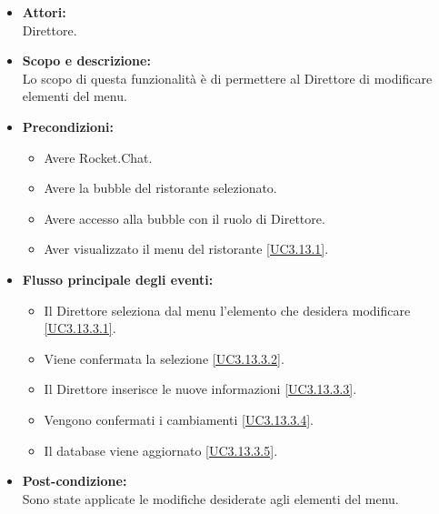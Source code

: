 
\begin{itemize}
	\item \textbf{Attori:}
	\\Direttore.
	\item \textbf{Scopo e descrizione:} 
	\\Lo scopo di questa funzionalità è di permettere al Direttore di modificare elementi del menu.
	\item \textbf{Precondizioni:}
	\begin{itemize}
		\item Avere Rocket.Chat.
		\item Avere la bubble del ristorante selezionato.
		\item Avere accesso alla bubble con il ruolo di Direttore.
		\item Aver visualizzato il menu del ristorante \ref{UC3.13.1}.
	\end{itemize}
	\item \textbf{Flusso principale degli eventi:}
	\begin{itemize}
		\item Il Direttore seleziona dal menu l'elemento che desidera modificare \ref{UC3.13.3.1}.
		\item Viene confermata la selezione \ref{UC3.13.3.2}.
		\item Il Direttore inserisce le nuove informazioni \ref{UC3.13.3.3}.
		\item Vengono confermati i cambiamenti \ref{UC3.13.3.4}.
		\item Il database viene aggiornato \ref{UC3.13.3.5}.
	\end{itemize}
	\item \textbf{Post-condizione:}
	\\Sono state applicate le modifiche desiderate agli elementi del menu.
\end{itemize}


